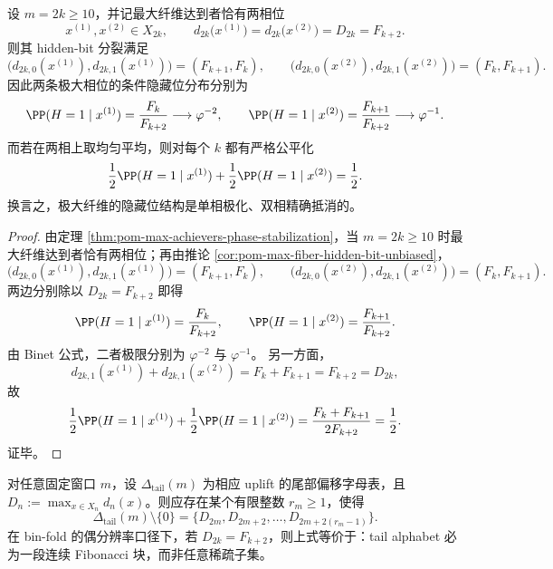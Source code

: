 \begin{theorem}[极大纤维偶支两相的精确公平化]\label{thm:conclusion-window6-even-maxfiber-hiddenbit-exact-fairization}
设 \(m=2k\ge 10\)，并记最大纤维达到者恰有两相位
\[
x^{(1)},x^{(2)}\in X_{2k},
\qquad
d_{2k}\bigl(x^{(1)}\bigr)=d_{2k}\bigl(x^{(2)}\bigr)=D_{2k}=F_{k+2}.
\]
则其 hidden-bit 分裂满足
\[
\bigl(d_{2k,0}(x^{(1)}),d_{2k,1}(x^{(1)})\bigr)=(F_{k+1},F_k),
\qquad
\bigl(d_{2k,0}(x^{(2)}),d_{2k,1}(x^{(2)})\bigr)=(F_k,F_{k+1}).
\]
因此两条极大相位的条件隐藏位分布分别为
\[
\PP(H=1\mid x^{(1)})=\frac{F_k}{F_{k+2}}\longrightarrow \varphi^{-2},
\qquad
\PP(H=1\mid x^{(2)})=\frac{F_{k+1}}{F_{k+2}}\longrightarrow \varphi^{-1}.
\]
而若在两相上取均匀平均，则对每个 \(k\) 都有严格公平化
\[
\frac12\PP(H=1\mid x^{(1)})+\frac12\PP(H=1\mid x^{(2)})=\frac12.
\]
换言之，极大纤维的隐藏位结构是单相极化、双相精确抵消的。
\end{theorem}

\begin{proof}
由定理 \ref{thm:pom-max-achievers-phase-stabilization}，当 \(m=2k\ge 10\) 时最大纤维达到者恰有两相位；再由推论 \ref{cor:pom-max-fiber-hidden-bit-unbiased}，
\[
\bigl(d_{2k,0}(x^{(1)}),d_{2k,1}(x^{(1)})\bigr)=(F_{k+1},F_k),
\qquad
\bigl(d_{2k,0}(x^{(2)}),d_{2k,1}(x^{(2)})\bigr)=(F_k,F_{k+1}).
\]
两边分别除以 \(D_{2k}=F_{k+2}\) 即得
\[
\PP(H=1\mid x^{(1)})=\frac{F_k}{F_{k+2}},
\qquad
\PP(H=1\mid x^{(2)})=\frac{F_{k+1}}{F_{k+2}}.
\]
由 Binet 公式，二者极限分别为 \(\varphi^{-2}\) 与 \(\varphi^{-1}\)。
另一方面，
\[
d_{2k,1}(x^{(1)})+d_{2k,1}(x^{(2)})=F_k+F_{k+1}=F_{k+2}=D_{2k},
\]
故
\[
\frac12\PP(H=1\mid x^{(1)})+\frac12\PP(H=1\mid x^{(2)})
=
\frac{F_k+F_{k+1}}{2F_{k+2}}
=\frac12.
\]
证毕。
\end{proof}







\begin{conjecture}\label{conj:conclusion-tail-alphabet-forward-maximality}
对任意固定窗口 \(m\)，设 \(\Delta_{\mathrm{tail}}(m)\) 为相应 uplift 的尾部偏移字母表，且 \(D_n:=\max_{x\in X_n}d_n(x)\)。则应存在某个有限整数 \(r_m\ge 1\)，使得
\[
\Delta_{\mathrm{tail}}(m)\setminus\{0\}
=
\{D_{2m},D_{2m+2},\dots,D_{2m+2(r_m-1)}\}.
\]
在 bin-fold 的偶分辨率口径下，若 \(D_{2k}=F_{k+2}\)，则上式等价于：tail alphabet 必为一段连续 Fibonacci 块，而非任意稀疏子集。
\end{conjecture}

